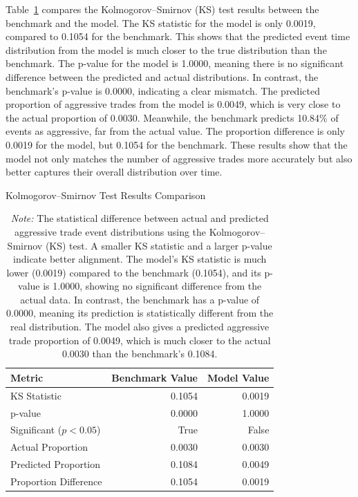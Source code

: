 Table~\ref{tb:ks-test-com} compares the Kolmogorov--Smirnov (KS) test results between the benchmark and the model. The KS statistic for the model is only 0.0019, compared to 0.1054 for the benchmark. This shows that the predicted event time distribution from the model is much closer to the true distribution than the benchmark. The p-value for the model is 1.0000, meaning there is no significant difference between the predicted and actual distributions. 
In contrast, the benchmark's p-value is 0.0000, indicating a clear mismatch.  The predicted proportion of aggressive trades from the model is 0.0049, which is very close to the actual proportion of 0.0030. Meanwhile, the benchmark predicts 10.84\% of events as aggressive, far from the actual value. The proportion difference is only 0.0019 for the model, but 0.1054 for the benchmark. These results show that the model not only matches the number of aggressive trades more accurately but also better captures their overall distribution over time.

\begin{table}[H]
    \centering
    \caption{Kolmogorov--Smirnov Test Results Comparison}
    \caption*{\textit{Note:} The statistical difference between actual and predicted aggressive trade event distributions using the Kolmogorov--Smirnov (KS) test. A smaller KS statistic and a larger p-value indicate better alignment. The model's KS statistic is much lower (0.0019) compared to the benchmark (0.1054), and its p-value is 1.0000, showing no significant difference from the actual data. In contrast, the benchmark has a p-value of 0.0000, meaning its prediction is statistically different from the real distribution. The model also gives a predicted aggressive trade proportion of 0.0049, which is much closer to the actual 0.0030 than the benchmark's 0.1084.}
    \label{tb:ks-test-com}
    \begin{tabular}{lrr}
    \toprule
    Metric & Benchmark Value & Model Value\\
    \midrule
    KS Statistic & 0.1054 & 0.0019 \\
    p-value & 0.0000 & 1.0000 \\
    Significant ($p < 0.05$) & True & False \\
    Actual Proportion & 0.0030 & 0.0030 \\
    Predicted Proportion & 0.1084 & 0.0049 \\
    Proportion Difference & 0.1054 & 0.0019 \\
    \bottomrule
    \end{tabular}
\end{table}